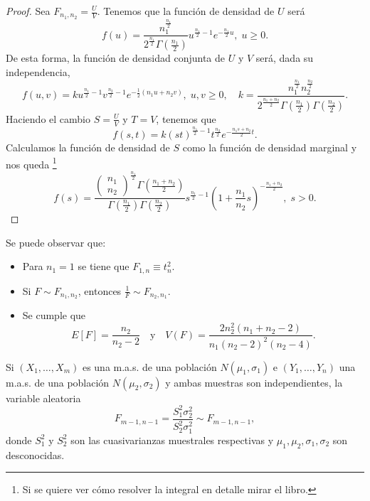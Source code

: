 \begin{proof}
Sea $\displaystyle F_{n_{1},n_{2}}=\frac{U}{V} $. Tenemos que la función de densidad de $\displaystyle U $ será
\[f\left(u\right)=\frac{n_{1}^{\frac{n_{1}}{2}}}{2^{\frac{n_{1}}{2}}\Gamma\left(\frac{n_{1}}{2}\right)}u^{\frac{n_{1}}{2}-1}e^{-\frac{n_{1}}{2}u}, \; u \geq 0 .\]
De esta forma, la función de densidad conjunta de $\displaystyle U $ y $\displaystyle V $ será, dada su independencia,
\[f\left(u,v\right) = k u^{\frac{n_{1}}{2}-1}v^{\frac{n_{2}}{2}-1}e^{-\frac{1}{2}\left(n_{1}u + n_{2}v\right)}, \; u, v \geq 0, \quad k = \frac{n_{1}^{\frac{n_{1}}{2}}n_{2}^{\frac{n_{2}}{2}}}{2^{\frac{n_{1}+n_{2}}{2}}\Gamma\left(\frac{n_{1}}{2}\right)\Gamma\left(\frac{n_{2}}{2}\right)}.\]
Haciendo el cambio $\displaystyle S = \frac{U}{V} $ y $\displaystyle T = V $, tenemos que 
\[f\left(s,t\right)=k\left(st\right)^{\frac{n_{1}}{2}-1}t ^{\frac{n_{2}}{2}}e^{-\frac{n_{1}s + n_{2}}{2}t} .\]
Calculamos la función de densidad de $\displaystyle S $ como la función de densidad marginal y nos queda \footnote{Si se quiere ver cómo resolver la integral en detalle mirar el libro.} 
\[f\left(s\right)=\frac{\begin{pmatrix} n_{1} \\ n_{2} \end{pmatrix}^{\frac{n_{1}}{2}}\Gamma\left(\frac{n_{1}+n_{2}}{2}\right)}{\Gamma\left(\frac{n_{1}}{2}\right)\Gamma\left(\frac{n_{2}}{2}\right)}s^{\frac{n_{1}}{2}-1}\left(1 + \frac{n_{1}}{n_{2}}s\right)^{-\frac{n_{1}+n_{2}}{2}}, \; s > 0  .\]
\end{proof}

\begin{observation} Se puede observar que:
	\begin{itemize}
	\item Para $\displaystyle n_{1}=1 $ se tiene que $\displaystyle F_{1, n}\equiv t_{n}^{2} $.
	\item Si $\displaystyle F \sim F_{n_{1}, n_{2}} $, entonces $\displaystyle \frac{1}{F}\sim F_{n_{2}, n_{1}} $. 
	\item Se cumple que 
		\[E\left[F\right] = \frac{n_{2}}{n_{2}-2} \quad \text{y} \quad V\left(F\right)=\frac{2n_{2}^{2}\left(n_{1}+n_{2}-2\right)}{n_{1}\left(n_{2}-2\right)^{2}\left(n_{2}-4\right)} .\]
	\end{itemize}
\end{observation}
\begin{colorary}
Si $\displaystyle \left(X_{1}, \ldots, X_{m}\right) $ es una m.a.s. de una población $\displaystyle N\left(\mu_{1}, \sigma_{1}\right) $ e $\displaystyle \left(Y_{1}, \ldots, Y_{n}\right) $ una m.a.s. de una población $\displaystyle N\left(\mu_{2}, \sigma_{2}\right) $ y ambas muestras son independientes, la variable aleatoria
\[F_{m -1, n-1}=\frac{S_{1}^{2}\sigma^{2}_{2}}{S_{2}^{2}\sigma_{1}^{2}} \sim F_{m - 1, n-1},\]
donde $\displaystyle S_{1}^{2} $ y $\displaystyle S_{2}^{2} $ son las cuasivarianzas muestrales respectivas y $\displaystyle \mu_{1}, \mu_{2}, \sigma_{1}, \sigma_{2} $ son desconocidas.
\end{colorary}
